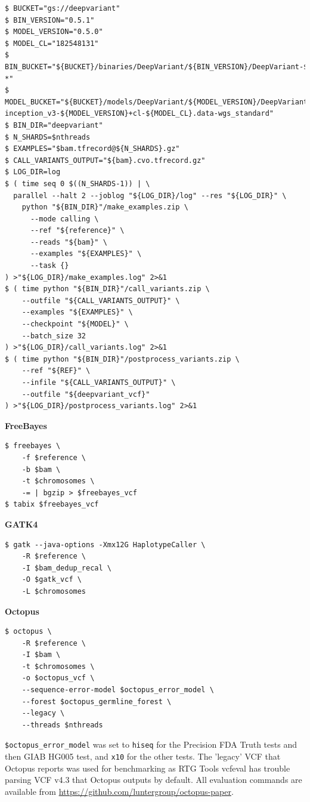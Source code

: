 \documentclass{article}
\begin{document}
\begin{lstlisting}
$ BUCKET="gs://deepvariant"
$ BIN_VERSION="0.5.1"
$ MODEL_VERSION="0.5.0"
$ MODEL_CL="182548131"
$ BIN_BUCKET="${BUCKET}/binaries/DeepVariant/${BIN_VERSION}/DeepVariant-${BIN_VERSION}+cl-*"
$ MODEL_BUCKET="${BUCKET}/models/DeepVariant/${MODEL_VERSION}/DeepVariant-inception_v3-${MODEL_VERSION}+cl-${MODEL_CL}.data-wgs_standard"
$ BIN_DIR="deepvariant"
$ N_SHARDS=$nthreads
$ EXAMPLES="$bam.tfrecord@${N_SHARDS}.gz"
$ CALL_VARIANTS_OUTPUT="${bam}.cvo.tfrecord.gz"
$ LOG_DIR=log
$ ( time seq 0 $((N_SHARDS-1)) | \
  parallel --halt 2 --joblog "${LOG_DIR}/log" --res "${LOG_DIR}" \
    python "${BIN_DIR}"/make_examples.zip \
      --mode calling \
      --ref "${reference}" \
      --reads "${bam}" \
      --examples "${EXAMPLES}" \
      --task {}
) >"${LOG_DIR}/make_examples.log" 2>&1
$ ( time python "${BIN_DIR}"/call_variants.zip \
    --outfile "${CALL_VARIANTS_OUTPUT}" \
    --examples "${EXAMPLES}" \
    --checkpoint "${MODEL}" \
    --batch_size 32
) >"${LOG_DIR}/call_variants.log" 2>&1
$ ( time python "${BIN_DIR}"/postprocess_variants.zip \
    --ref "${REF}" \
    --infile "${CALL_VARIANTS_OUTPUT}" \
    --outfile "${deepvariant_vcf}"
) >"${LOG_DIR}/postprocess_variants.log" 2>&1
\end{lstlisting}

\noindent \textbf{FreeBayes}

\begin{lstlisting}
$ freebayes \
    -f $reference \
    -b $bam \
    -t $chromosomes \
    -= | bgzip > $freebayes_vcf
$ tabix $freebayes_vcf
\end{lstlisting}

\noindent \textbf{GATK4}

\begin{lstlisting}
$ gatk --java-options -Xmx12G HaplotypeCaller \
    -R $reference \
    -I $bam_dedup_recal \
    -O $gatk_vcf \
    -L $chromosomes
\end{lstlisting}

\noindent \textbf{Octopus}

\begin{lstlisting}
$ octopus \
    -R $reference \
    -I $bam \
    -t $chromosomes \
    -o $octopus_vcf \
    --sequence-error-model $octopus_error_model \
    --forest $octopus_germline_forest \
    --legacy \
    --threads $nthreads
\end{lstlisting}

\noindent\lstinline!$octopus_error_model! was set to \lstinline!hiseq! for the Precision FDA Truth tests and then GIAB HG005 test, and \lstinline!x10! for the other tests. The 'legacy' VCF that Octopus reports was used for benchmarking as RTG Tools vcfeval has trouble parsing VCF v4.3 that Octopus outputs by default. All evaluation commands are available from \url{https://github.com/luntergroup/octopus-paper}.
\end{document}
